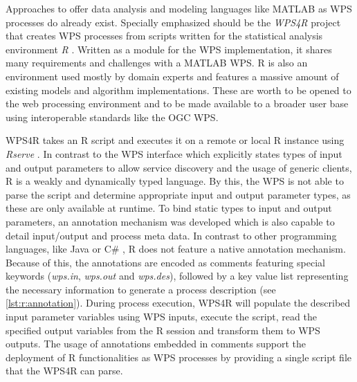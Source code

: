 Approaches to offer data analysis and modeling languages like MATLAB as \ac{WPS} processes do already exist. Specially emphasized should be the \emph{WPS4R} \citep{wps4r} project that creates WPS processes from scripts written for the statistical analysis environment \emph{R} \citep{gnur}. Written as a module for the \ftn \ac{WPS} implementation, it shares many requirements and challenges with a MATLAB WPS. R is also an environment used mostly by domain experts and features a massive amount of existing models and algorithm implementations. These are worth to be opened to the web processing environment and to be made available to a broader user base using interoperable standards like the \ac{OGC} \acl{WPS}.



WPS4R takes an R script and executes it on a remote or local R instance using \emph{Rserve} \citep{rserve}. In contrast to the \ac{WPS} interface which explicitly states types of input and output parameters to allow service discovery and the usage of generic clients, R is a weakly and dynamically typed language. By this, the \ac{WPS} is not able to parse the script and determine appropriate input and output parameter types, as these are only available at runtime. To bind static types to input and output parameters, an annotation mechanism was developed which is also capable to detail input/output and process meta data. In contrast to other programming languages, like Java \citep{jsr175} or C\# \citep{ecma335}, R does not feature a native annotation mechanism. Because of this, the annotations are encoded as comments featuring special keywords (\emph{wps.in}, \emph{wps.out} and \emph{wps.des}), followed by a key value list representing the necessary information to generate a process description (see \cref{lst:r:annotation}). During process execution, WPS4R will populate the described input parameter variables using \ac{WPS} inputs, execute the script, read the specified output variables from the R session and transform them to WPS outputs. The usage of annotations embedded in comments support the deployment of R functionalities as WPS processes by providing a single script file that the WPS4R can parse.


